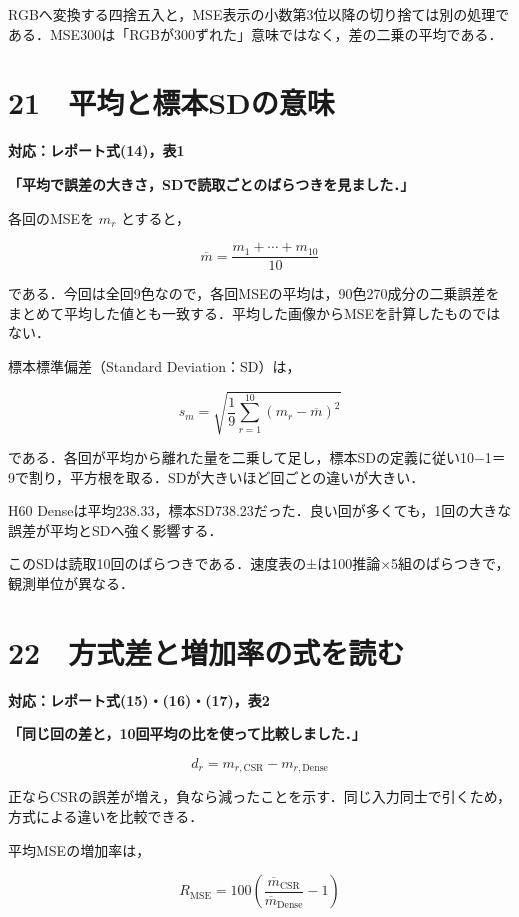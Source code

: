 \documentclass[
  14pt,
  a5paper,
]{extarticle}
\begin{document}
RGBへ変換する四捨五入と，MSE表示の小数第3位以降の切り捨ては別の処理である．MSE300は「RGBが300ずれた」意味ではなく，差の二乗の平均である．

\newpage

\section{21　平均と標本SDの意味}\label{ux5e73ux5747ux3068ux6a19ux672csdux306eux610fux5473}

\textbf{対応：レポート式(14)，表1}

\textbf{「平均で誤差の大きさ，SDで読取ごとのばらつきを見ました．」}

各回のMSEを \(m_r\) とすると，

\[\overline m=\frac{m_1+\cdots+m_{10}}{10}\]

である．今回は全回9色なので，各回MSEの平均は，90色270成分の二乗誤差をまとめて平均した値とも一致する．平均した画像からMSEを計算したものではない．

標本標準偏差（Standard Deviation：SD）は，

\[s_m=\sqrt{\frac1{9}
\sum_{r=1}^{10}(m_r-\overline m)^2}\]

である．各回が平均から離れた量を二乗して足し，標本SDの定義に従い10−1＝9で割り，平方根を取る．SDが大きいほど回ごとの違いが大きい．

H60
Denseは平均238.33，標本SD738.23だった．良い回が多くても，1回の大きな誤差が平均とSDへ強く影響する．

このSDは読取10回のばらつきである．速度表の±は100推論×5組のばらつきで，観測単位が異なる．

\newpage

\section{22　方式差と増加率の式を読む}\label{ux65b9ux5f0fux5deeux3068ux5897ux52a0ux7387ux306eux5f0fux3092ux8aadux3080}

\textbf{対応：レポート式(15)・(16)・(17)，表2}

\textbf{「同じ回の差と，10回平均の比を使って比較しました．」}

\[d_r=m_{r,\mathrm{CSR}}-m_{r,\mathrm{Dense}}\]

正ならCSRの誤差が増え，負なら減ったことを示す．同じ入力同士で引くため，方式による違いを比較できる．

平均MSEの増加率は，

\[R_{\mathrm{MSE}}=
100\left(\frac{\overline m_{\mathrm{CSR}}}
{\overline m_{\mathrm{Dense}}}-1\right)\]
\end{document}
